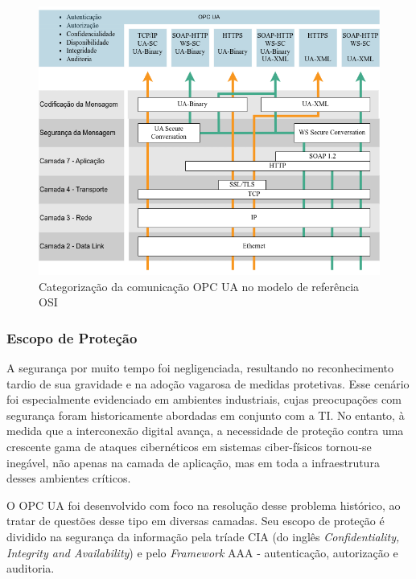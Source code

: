         \begin{figure}[htbp]
            \caption{Categorização da comunicação OPC UA no modelo de referência OSI}
            \label{fig:ua-osi}
            \begin{center}
                \includegraphics[width=0.9\linewidth]{USPSC-img/ua-osi-low.png}
            \end{center}
        \end{figure}

        \subsubsection{Escopo de Proteção}

        A segurança por muito tempo foi negligenciada, resultando no reconhecimento tardio de sua gravidade e na adoção vagarosa de medidas protetivas. Esse cenário foi especialmente evidenciado em ambientes industriais, cujas preocupações com segurança foram historicamente abordadas em conjunto com a TI. No entanto, à medida que a interconexão digital avança, a necessidade de proteção contra uma crescente gama de ataques cibernéticos em sistemas ciber-físicos tornou-se inegável, não apenas na camada de aplicação, mas em toda a infraestrutura desses ambientes críticos.
        
        O OPC UA foi desenvolvido com foco na resolução desse problema histórico, ao tratar de questões desse tipo em diversas camadas. Seu escopo de proteção é dividido na segurança da informação pela tríade CIA (do inglês \textit{Confidentiality, Integrity and Availability}) e pelo \textit{Framework} AAA - autenticação, autorização e auditoria.
        
